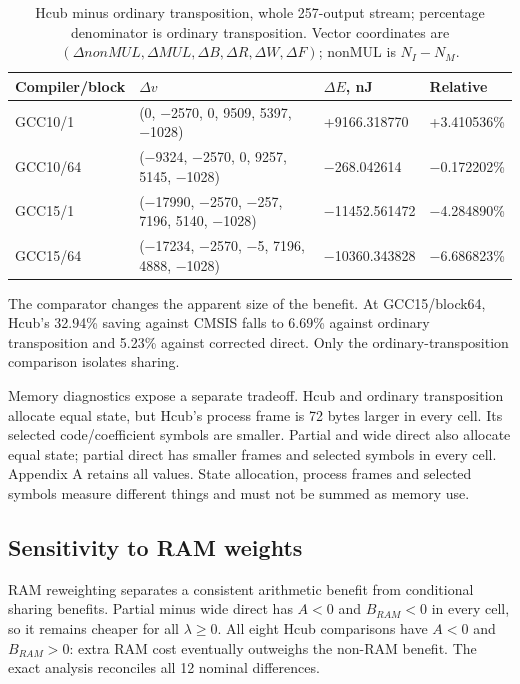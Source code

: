 \documentclass[conference]{IEEEtran}
\begin{document}
\begin{table}[t]
\centering\footnotesize
\caption{Hcub minus ordinary transposition, whole 257-output stream; percentage
denominator is ordinary transposition. Vector coordinates are
\((\Delta nonMUL,\Delta MUL,\Delta B,\Delta R,\Delta W,\Delta F)\);
nonMUL is \(N_I-N_M\).}\label{tab:5}
\begin{tabularx}{\textwidth}{@{}>{\raggedright\arraybackslash}X>{\raggedright\arraybackslash}X>{\raggedright\arraybackslash}X>{\raggedright\arraybackslash}X@{}}
\toprule
Compiler/block & \(\Delta v\) & \(\Delta E\), nJ & Relative \\
\midrule
GCC10/1 & (0, −2570, 0, 9509, 5397, −1028) & +9166.318770 & +3.410536\% \\
GCC10/64 & (−9324, −2570, 0, 9257, 5145, −1028) & −268.042614 & −0.172202\% \\
GCC15/1 & (−17990, −2570, −257, 7196, 5140, −1028) & −11452.561472 & −4.284890\% \\
GCC15/64 & (−17234, −2570, −5, 7196, 4888, −1028) & −10360.343828 & −6.686823\% \\
\bottomrule
\end{tabularx}
\end{table}

The comparator changes the apparent size of the benefit. At
GCC15/block64, Hcub's 32.94\% saving against CMSIS falls to 6.69\%
against ordinary transposition and 5.23\% against corrected direct. Only
the ordinary-transposition comparison isolates sharing.

Memory diagnostics expose a separate tradeoff. Hcub and ordinary
transposition allocate equal state, but Hcub's process frame is 72 bytes
larger in every cell. Its selected code/coefficient symbols are smaller.
Partial and wide direct also allocate equal state; partial direct has
smaller frames and selected symbols in every cell. Appendix A retains
all values. State allocation, process frames and selected symbols
measure different things and must not be summed as memory use.

\subsection{Sensitivity to RAM weights}\label{sensitivity-to-ram-weights}

RAM reweighting separates a consistent arithmetic benefit from
conditional sharing benefits. Partial minus wide direct has \(A<0\) and
\(B_{RAM}<0\) in every cell, so it remains cheaper for all
\(\lambda\ge0\). All eight Hcub comparisons have \(A<0\) and
\(B_{RAM}>0\): extra RAM cost eventually outweighs the non-RAM benefit.
The exact analysis reconciles all 12 nominal differences.
\end{document}
